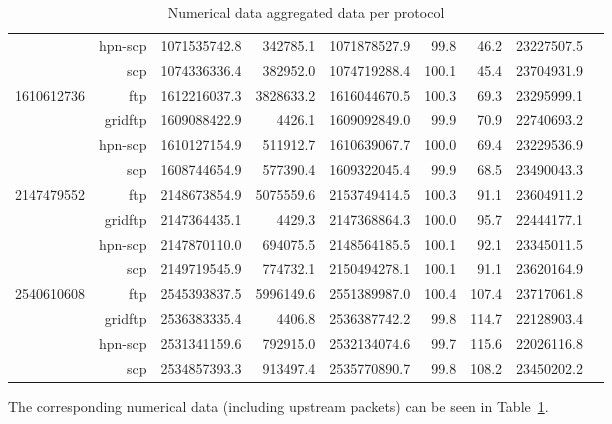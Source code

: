 \documentclass{sig-alternate-05-2015}
\begin{document}
\begin{table}
\begin{tabular}{lrlrrrrrr}
	           &  hpn-scp & 1071535742.8 &  342785.1 & 1071878527.9 &       99.8 &      46.2 &       23227507.5 \\
	           &      scp & 1074336336.4 &  382952.0 & 1074719288.4 &      100.1 &      45.4 &       23704931.9 \\
	\midrule
	1610612736 &      ftp & 1612216037.3 & 3828633.2 & 1616044670.5 &      100.3 &      69.3 &       23295999.1 \\
	           &  gridftp & 1609088422.9 &    4426.1 & 1609092849.0 &       99.9 &      70.9 &       22740693.2 \\
	           &  hpn-scp & 1610127154.9 &  511912.7 & 1610639067.7 &      100.0 &      69.4 &       23229536.9 \\
	           &      scp & 1608744654.9 &  577390.4 & 1609322045.4 &       99.9 &      68.5 &       23490043.3 \\
	\midrule
	2147479552 &      ftp & 2148673854.9 & 5075559.6 & 2153749414.5 &      100.3 &      91.1 &       23604911.2 \\
	           &  gridftp & 2147364435.1 &    4429.3 & 2147368864.3 &      100.0 &      95.7 &       22444177.1 \\
	           &  hpn-scp & 2147870110.0 &  694075.5 & 2148564185.5 &      100.1 &      92.1 &       23345011.5 \\
	           &      scp & 2149719545.9 &  774732.1 & 2150494278.1 &      100.1 &      91.1 &       23620164.9 \\
	\midrule
	2540610608 &      ftp & 2545393837.5 & 5996149.6 & 2551389987.0 &      100.4 &     107.4 &       23717061.8 \\
	           &  gridftp & 2536383335.4 &    4406.8 & 2536387742.2 &       99.8 &     114.7 &       22128903.4 \\
	           &  hpn-scp & 2531341159.6 &  792915.0 & 2532134074.6 &       99.7 &     115.6 &       22026116.8 \\
	           &      scp & 2534857393.3 &  913497.4 & 2535770890.7 &       99.8 &     108.2 &       23450202.2 \\
	\bottomrule
	\end{tabular}
\caption{Numerical data aggregated data per protocol}
\label{tab:aggregate}
\end{table}

The corresponding numerical data (including upstream packets) can be seen in Table~\ref{tab:aggregate}.
\end{document}
